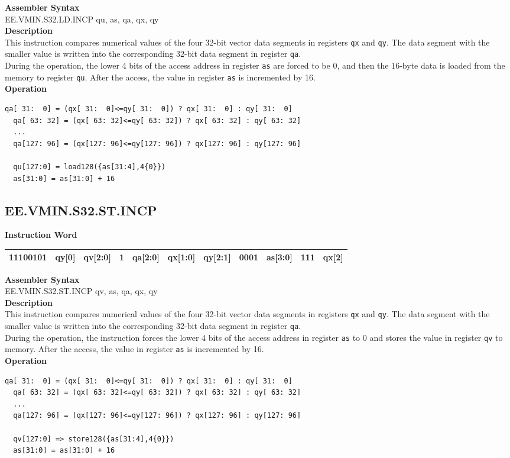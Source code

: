\textbf{Assembler Syntax} \\
EE.VMIN.S32.LD.INCP qu, as, qa, qx, qy \\
\textbf{Description} \\
This instruction compares numerical values of the four 32-bit vector data segments in registers \lstinline{qx} and \lstinline{qy}. The data segment with the smaller value is written into the corresponding 32-bit data segment in register \lstinline{qa}.\\
During the operation, the lower 4 bits of the access address in register \lstinline{as} are forced to be 0, and then the 16-byte data is loaded from the memory to register \lstinline{qu}. After the access, the value in register \lstinline{as} is incremented by 16.\\
\textbf{Operation}
\begin{lstlisting}[escapeinside=`?]
  qa[ 31:  0] = (qx[ 31:  0]<=qy[ 31:  0]) ? qx[ 31:  0] : qy[ 31:  0]
  qa[ 63: 32] = (qx[ 63: 32]<=qy[ 63: 32]) ? qx[ 63: 32] : qy[ 63: 32]
  ...
  qa[127: 96] = (qx[127: 96]<=qy[127: 96]) ? qx[127: 96] : qy[127: 96]

  qu[127:0] = load128({as[31:4],4{0}})
  as[31:0] = as[31:0] + 16
\end{lstlisting}

\clearpage
\subsection{EE.VMIN.S32.ST.INCP}\label{instruction:EEVMINS32STINCP}
\setlength\tabcolsep{6pt}
\textbf{Instruction Word} \\
\begin{tabular}{|c|c|c|c|c|c|c|c|c|c|c|}
	\hline
	11100101 & qy[0] & qv[2:0] & 1 & qa[2:0] & qx[1:0] & qy[2:1] & 0001 & as[3:0] & 111 & qx[2] \\
	\hline
\end{tabular}

\textbf{Assembler Syntax} \\
EE.VMIN.S32.ST.INCP qv, as, qa, qx, qy \\
\textbf{Description} \\
This instruction compares numerical values of the four 32-bit vector data segments in registers \lstinline{qx} and \lstinline{qy}. The data segment with the smaller value is written into the corresponding 32-bit data segment in register \lstinline{qa}.\\
During the operation, the instruction forces the lower 4 bits of the access address in register \lstinline{as} to 0 and stores the value in register \lstinline{qv} to memory. After the access, the value in register \lstinline{as} is incremented by 16.\\
\textbf{Operation}
\begin{lstlisting}[escapeinside=`?]
  qa[ 31:  0] = (qx[ 31:  0]<=qy[ 31:  0]) ? qx[ 31:  0] : qy[ 31:  0]
  qa[ 63: 32] = (qx[ 63: 32]<=qy[ 63: 32]) ? qx[ 63: 32] : qy[ 63: 32]
  ...
  qa[127: 96] = (qx[127: 96]<=qy[127: 96]) ? qx[127: 96] : qy[127: 96]

  qv[127:0] => store128({as[31:4],4{0}})
  as[31:0] = as[31:0] + 16
\end{lstlisting}

